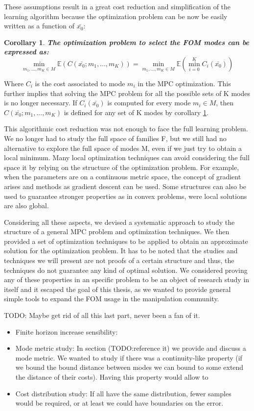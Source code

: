 \documentclass[12,twoside]{TFG-GM}
\newtheorem{corollary}[theorem]{Corollary}
\theoremstyle{definition}
\theoremstyle{remark}
\newcommand*\diff[1]{\bar{#1}}
\begin{document}
These assumptions result in a great cost reduction and simplification of the learning algorithm because the optimization problem can be now be easily written as a function of $\diff{x_0}$:
\begin{corollary} \textbf{The optimization problem to select the FOM modes can be expressed as:} \label{cor:costfunction} 
 $$\min\limits_{m_1, ..., m_K \in M}\mathbb{E}(C(\diff{x_0}; m_1, ..., m_K)) = \min\limits_{m_1, ..., m_K \in M}\mathbb{E}(\min\limits_{i = 0}^{K}{C_i(\diff{x_0})})$$
 
\end{corollary}
Where $C_i$ is the cost associated to mode $m_i$ in the MPC optimization. This further implies that solving the MPC problem for all the possible sets of K modes is no longer necessary. If $C_i(\diff{x_0})$ is computed for every mode $m_i \in M$, then $C(\diff{x_0}; m_1, ..., m_K)$ is defined for any set of K modes by corollary \ref{cor:costfunction}.

This algorithmic cost reduction was not enough to face the full learning problem. We no longer had to study the full space of families F, but we still had no alternative to explore the full space of modes M, even if we just try to obtain a local minimum. Many local optimization techniques can avoid considering the full space it by relying on the structure of the optimization problem. For example, when the parameters are on a continuous metric space, the concept of gradient arises and methods as gradient descent can be used. Some structures can also be used to guarantee stronger properties as in convex problems, were local solutions are also global.

Considering all these aspects, we devised a systematic approach to study the structure of a general MPC problem and optimization techniques. We then provided a set of optimization techniques to be applied to obtain an approximate solution for the optimization problem. It has to be noted that the studies and techniques we will present are not proofs of a certain structure and thus, the techniques do not guarantee any kind of optimal solution. We considered proving any of these properties in an specific problem to be an object of research study in itself and it escaped the goal of this thesis, as we wanted to provide general simple tools to expand the FOM usage in the manipulation community.

TODO: Maybe get rid of all this last part, never been a fan of it.
\begin{itemize}
\item {Finite horizon increase sensibility:}
\item {Mode metric study:} In section (TODO:reference it) we provide and discuss a mode metric. We wanted to study if there was a continuity-like property (if we bound the bound distance between modes we can bound to some extend the distance of their costs). Having this property would allow to 
\item {Cost distribution study:} If all have the same distribution, fewer samples would be required, or at least we could have boundaries on the error.
\end{itemize}
\end{document}
